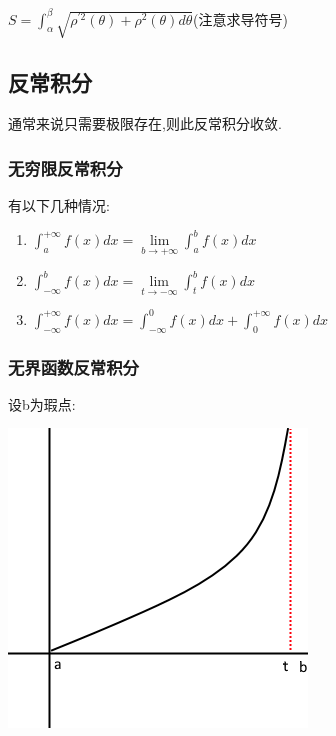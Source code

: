 \documentclass[UTF8,12pt]{ctexbook}
\newcommand{\limNormal}[1]{\lim\limits_{#1}}
\newcommand{\defFunction}[1]{f(#1)}
\newcommand{\definiteIntegral}[2]{\int^{#1}_{#2}}
\begin{document}
{{{{  $S = \definiteIntegral{\beta}{\alpha}\sqrt{\rho^{\prime 2}(\theta) + \rho^2(\theta)d\theta}$\qquad(注意求导符号)
}%

}%

\subsection{反常积分}{
通常来说只需要极限存在,则此反常积分收敛.

\subsubsection{无穷限反常积分}{

  有以下几种情况:

  \begin{enumerate}
    \item $\definiteIntegral{+\infty}{a}\defFunction{x}dx = \limNormal{b \to +\infty}\definiteIntegral{b}{a}\defFunction{x}dx$
    \item $\definiteIntegral{b}{-\infty}\defFunction{x}dx = \limNormal{t \to -\infty}\definiteIntegral{b}{t}\defFunction{x}dx$
    \item $\definiteIntegral{+\infty}{-\infty}\defFunction{x}dx = \definiteIntegral{0}{-\infty}\defFunction{x}dx + \definiteIntegral{+\infty}{0}\defFunction{x}dx$
  \end{enumerate}
}%


\subsubsection{无界函数反常积分}{

  设b为瑕点:

  \begin{center}
    \includegraphics[scale=0.5]{resources/infityFunctionUnormalIntegral.png}
  \end{center}

}}}}
\end{document}
